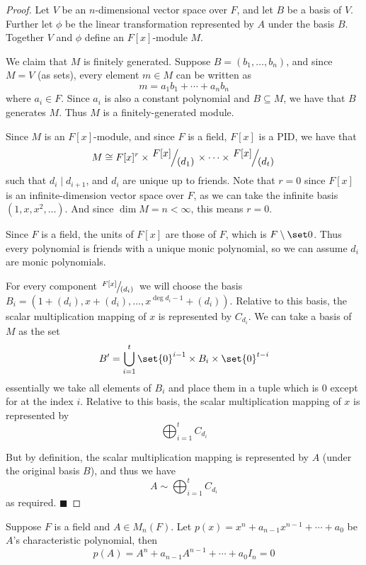 \documentclass[10pt]{article}
\def\divides{{\mid}}
\def\qed{%
    \ifmmode%
        \eqno\blacksquare%
    \else%
        \hskip1cm\hbox{}\hfill$\blacksquare$%
    \fi%
}
\begin{document}
\begin{proof}

    Let $V$ be an $n$-dimensional vector space over $F$, and let $B$ be a basis of $V$.
    Further let $\phi$ be the linear transformation represented by $A$ under the basis $B$.
    Together $V$ and $\phi$ define an $F[x]$-module $M$.

    We claim that $M$ is finitely generated.
    Suppose $B=(b_1,\dots,b_n)$, and since $M=V$ (as sets), every element $m\in M$ can be written as
    \[ m = a_1b_1 + \cdots + a_nb_n \]
    where $a_i\in F$.
    Since $a_i$ is also a constant polynomial and $B\subseteq M$, we have that $B$ generates $M$.
    Thus $M$ is a finitely-generated module.

    Since $M$ is an $F[x]$-module, and since $F$ is a field, $F[x]$ is a PID, we have that
    \[ M\cong F[x]^r\times\slfrac{F[x]}{(d_1)}\times\cdots\times\slfrac{F[x]}{(d_t)} \]
    such that $d_i\divides d_{i+1}$, and $d_i$ are unique up to friends.
    Note that $r=0$ since $F[x]$ is an infinite-dimension vector space over $F$, as we can take the infinite basis $(1,x,x^2,\dots)$.
    And since $\dim M=n<\infty$, this means $r=0$.

    Since $F$ is a field, the units of $F[x]$ are those of $F$, which is $F\setminus\set 0$.
    Thus every polynomial is friends with a unique monic polynomial, so we can assume $d_i$ are monic polynomials.

    For every component $\slfrac{F[x]}{(d_i)}$ we will choose the basis $B_i=(1+(d_i), x+(d_i), \dots, x^{\deg d_i-1}+(d_i))$.
    Relative to this basis, the scalar multiplication mapping of $x$ is represented by $C_{d_i}$.
    We can take a basis of $M$ as the set
    \[ B' = \bigcup_{i=1}^t \set{0}^{i-1}\times B_i\times\set{0}^{t-i} \]
    essentially we take all elements of $B_i$ and place them in a tuple which is $0$ except for at the index $i$.
    Relative to this basis, the scalar multiplication mapping of $x$ is represented by
    \[ \bigoplus_{i=1}^t C_{d_i} \]

    But by definition, the scalar multiplication mapping is represented by $A$ (under the original basis $B$), and thus we have
    \[ A\sim\bigoplus_{i=1}^t C_{d_i} \]
    as required.
    \qed

\end{proof}

\begin{thrm*}

    Suppose $F$ is a field and $A\in M_n(F)$.
    Let $p(x)=x^n+a_{n-1}x^{n-1}+\cdots+a_0$ be $A$'s characteristic polynomial, then
    \[ p(A) = A^n + a_{n-1}A^{n-1} + \cdots + a_0I_n = 0 \]

\end{thrm*}
\end{document}
